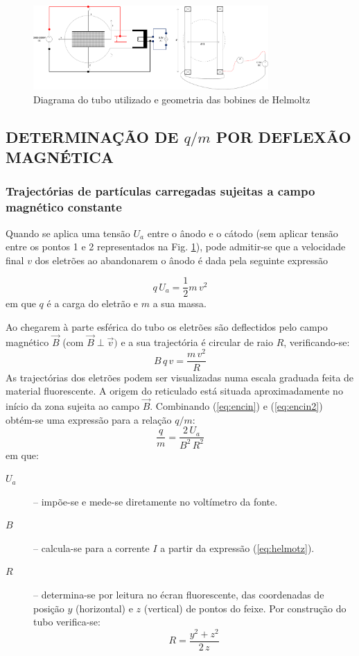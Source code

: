 \documentclass[a4paper,twoside,12pt]{article}      %
\begin{document}
\begin{figure}
	[!tb]  \centering 
	\includegraphics[width=0.8\textwidth]{TuboTL} 
	\caption{Diagrama do tubo utilizado e geometria das bobines de Helmoltz \label{fig:TL}} 
\end{figure}

\subsection{\sf DETERMINAÇÃO DE $q/m$ POR  DEFLEXÃO MAGNÉTICA}
\subsubsection{\sf Trajectórias de partículas carregadas sujeitas a campo magnético constante}
Quando se aplica uma tensão $U_a$ entre o ânodo e o cátodo (sem aplicar tensão entre os pontos 1 e 2 representados na Fig. \ref{fig:TL}), pode admitir-se que a velocidade final $v$ dos eletrões ao abandonarem o ânodo é dada pela seguinte expressão 

\begin{equation}
	\label{eq:encin}
q\, U_a = \frac{1}{2} m \, v^2
\end{equation}
em que $q$  é a carga do eletrão e $m$ a sua massa.

Ao chegarem à parte esférica do tubo os eletrões são deflectidos pelo campo magnético $\vec{B}$ (com $\vec{B}\perp\vec{v})$ e a sua trajectória é circular de raio $R$, verificando-se:
\begin{equation}
	\label{eq:encin2}
B \, q\, v = \frac{m\,v^2}{R} 
\end{equation}
As trajectórias dos eletrões podem ser visualizadas numa escala graduada feita de material fluorescente. 
A origem do reticulado está situada aproximadamente no início da zona 
sujeita ao campo $\vec{B}$.
Combinando (\ref{eq:encin}) e (\ref{eq:encin2}) obtém-se uma expressão para a relação $q/m$:
\begin{equation}
	\label{eq:encin3}
 \frac{q}{m} = \frac{2\, U_a}{B^2\,R^2} 
\end{equation}
em que:
\begin{description}
\item[$U_a$] – impõe-se e mede-se diretamente no voltímetro da fonte.
\item[$B$] – calcula-se para a corrente $I$ a partir da expressão (\ref{eq:helmotz}).
\item[$R$] – determina-se por leitura no écran fluorescente, das coordenadas de posição $y$ (horizontal) e $z$ (vertical) de pontos do feixe. Por construção do tubo verifica-se:
\begin{equation}
	\label{eq:eR}
 R = \frac{y^2 + z^2}{2 \, z} 
\end{equation}
\end{description}
\end{document}

